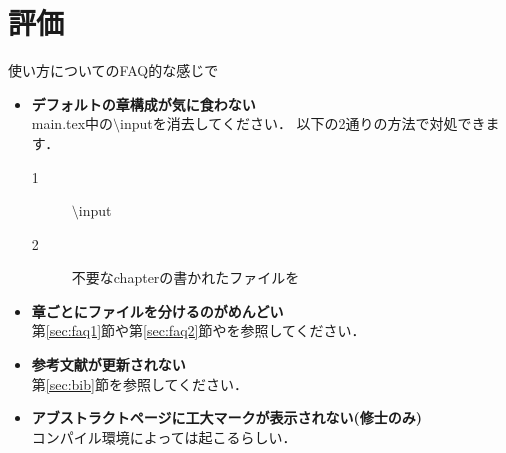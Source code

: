 \chapter{評価}
\label{sec:result}

使い方についてのFAQ的な感じで


\begin{itemize}
\item   {\bf デフォルトの章構成が気に食わない}\\
                main.tex中の$\setminus$inputを消去してください．
                以下の2通りの方法で対処できます．
                \begin{description}
                        \item[1] $\setminus$input 
                        \item[2] 不要なchapterの書かれたファイルを
                \end{description}
\item   {\bf 章ごとにファイルを分けるのがめんどい}\\
                第\ref{sec:faq1}節や第\ref{sec:faq2}節やを参照してください．
\item   {\bf 参考文献が更新されない}\\
                第\ref{sec:bib}節を参照してください．
\item   {\bf アブストラクトページに工大マークが表示されない(修士のみ)}\\
                コンパイル環境によっては起こるらしい．
\end{itemize}




